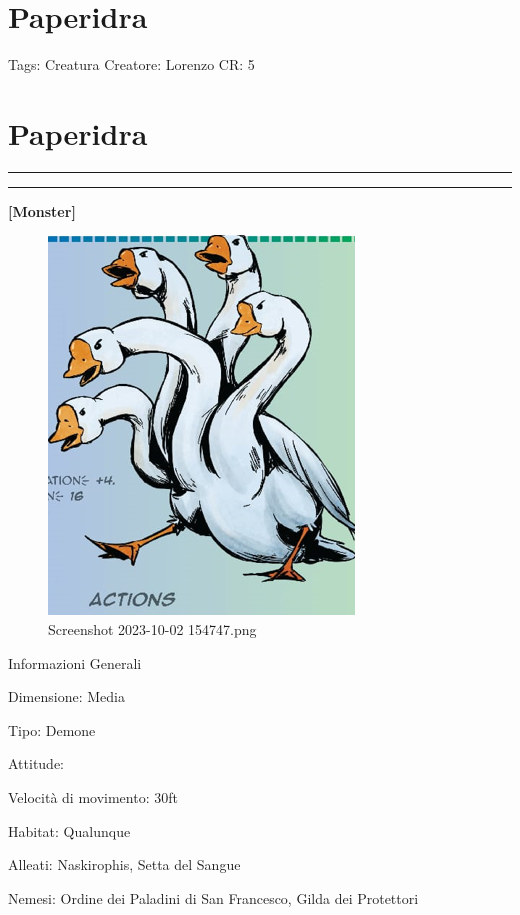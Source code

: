 \section{Paperidra}\label{paperidra}

Tags: Creatura Creatore: Lorenzo CR: 5

\section{Paperidra}\label{paperidra-1}

\begin{center}\rule{0.5\linewidth}{0.5pt}\end{center}

\begin{center}\rule{0.5\linewidth}{0.5pt}\end{center}

\textbf{{[}Monster{]}}

\begin{figure}
\centering
\includegraphics{Screenshot_2023-10-02_154747.png}
\caption{Screenshot 2023-10-02 154747.png}
\end{figure}

Informazioni Generali

Dimensione: Media

Tipo: Demone

Attitude:

Velocità di movimento: 30ft

Habitat: Qualunque

Alleati: Naskirophis, Setta del Sangue

Nemesi: Ordine dei Paladini di San Francesco, Gilda dei Protettori

